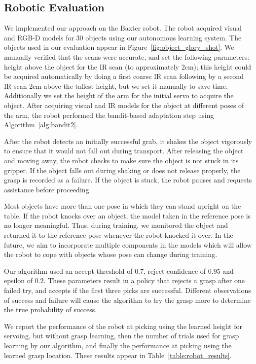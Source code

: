 \documentclass{article}
\begin{document}
\subsection{Robotic Evaluation}

We implemented our approach on the Baxter robot.  The robot acquired
visual and RGB-D models for 30 objects using our autonomous learning
system.  The objects used in our evaluation appear in
Figure~\ref{fig:object_glory_shot}. We manually verified that the
scans were accurate, and set the following parameters: height above
the object for the IR scan (to approximately 2cm); this height could
be acquired automatically by doing a first coarse IR scan following by
a second IR scan 2cm above the tallest height, but we set it manually
to save time.  Additionally we set the height of the arm for the
initial servo to acquire the object.  After acquiring visual and IR
models for the object at different poses of the arm, the robot
performed the bandit-based adaptation step using
Algorithm~\ref{alg:bandit2}.


After the robot detects an initially successful grab, it shakes the
object vigorously to ensure that it would not fall out during
transport. After releasing the object and moving away, the robot
checks to make sure the object is not stuck in its gripper. If the
object falls out during shaking or does not release properly, the
grasp is recorded as a failure. If the object is stuck, the robot
pauses and requests assistance before proceeding.

Most objects have more than one pose in which they can stand upright
on the table. If the robot knocks over an object, the model taken in
the reference pose is no longer meaningful. Thus, during training, we
monitored the object and returned it to the reference pose whenever
the robot knocked it over. In the future, we aim to incorporate
multiple components in the models which will allow the robot to cope
with objects whose pose can change during training.

Our algorithm used an accept threshold of $0.7$, reject confidence of
$0.95$ and epsilon of $0.2$.  These parameters result in a policy that
rejects a grasp after one failed try, and accepts if the first three
picks are successful.  Different observations of success and failure
will cause the algorithm to try the grasp more to determine the true
probability of success.  

We report the performance of the robot at picking using the learned
height for servoing, but without grasp learning, then the number of
trials used for grasp learning by our algorithm, and finally the
performance at picking using the learned grasp location.  These
results appear in Table~\ref{table:robot_results}.
\end{document}
